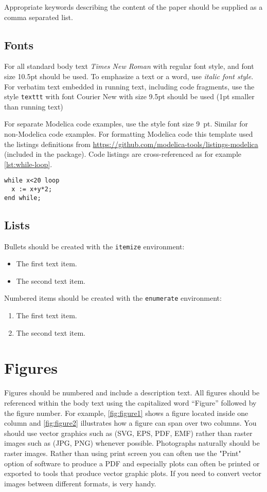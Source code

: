 \documentclass{modelica}
\begin{document}
Appropriate keywords describing the content of the paper should be
supplied as a comma separated list.

\subsection{Fonts}

For all standard body text \emph{Times New Roman} with regular font style, and font size 10.5pt should be used. To emphasize a text or a word, use \emph{italic font style}. For verbatim text embedded in running text, including code fragments, use the style {\small\texttt{texttt}} with font Courier New with size 9.5pt should be used (1pt smaller than running text)

For separate Modelica code examples, use the style font size 9~pt.
Similar for non-Modelica code examples.
For formatting Modelica code this template used the listings definitions from {\small\url{https://github.com/modelica-tools/listings-modelica}} (included in the package).
Code listings are cross-referenced as for example \autoref{lst:while-loop}.

\begin{lstlisting}[caption=A while loop,label=lst:while-loop]
while x<20 loop
  x := x+y*2;
end while;
\end{lstlisting}

\subsection{Lists}

Bullets should be created with the \texttt{itemize} environment:
\begin{itemize}
\item The first text item.
\item The second text item.
\end{itemize}
Numbered items should be created with the \texttt{enumerate} environment:
\begin{enumerate}
\item The first text item.
\item The second text item.
\end{enumerate}

\section{Figures}

Figures should be numbered and include a description text. All figures
should be referenced within the body text using the capitalized word
``Figure'' followed by the figure number. For example,
\autoref{fig:figure1} shows a figure located inside one column and
\autoref{fig:figure2} illustrates how a figure can span over two
columns.
You should use vector graphics such as (SVG, EPS, PDF, EMF) rather than raster images such as (JPG, PNG) whenever possible.
Photographs naturally should be raster images.
Rather than using print screen you can often use the "Print" option of software to produce a PDF and especially plots can often be printed or exported to tools that produce vector graphic plots.
If you need to convert vector images between different formats, \textcite{inkscape} is very handy.
\end{document}
